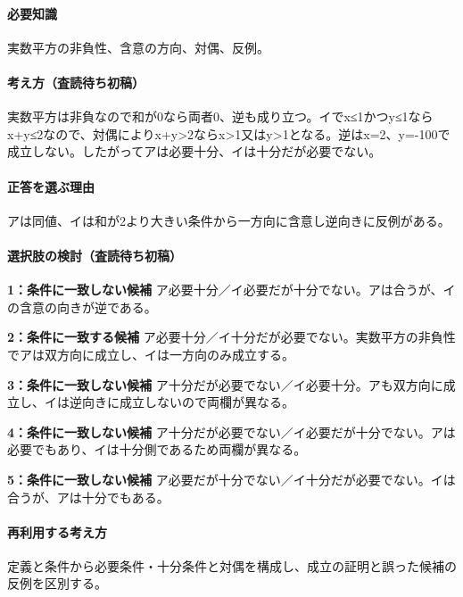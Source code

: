 \paragraph{必要知識} 実数平方の非負性、含意の方向、対偶、反例。

\paragraph{考え方（査読待ち初稿）} 実数平方は非負なので和が0なら両者0、逆も成り立つ。イでx≤1かつy≤1ならx+y≤2なので、対偶によりx+y>2ならx>1又はy>1となる。逆はx=\allowbreak{}2、y=-100で成立しない。したがってアは必要十分、イは十分だが必要でない。

\paragraph{正答を選ぶ理由} アは同値、イは和が2より大きい条件から一方向に含意し逆向きに反例がある。

\paragraph{選択肢の検討（査読待ち初稿）}\mbox{}\par

\noindent\textbf{1：条件に一致しない候補} ア必要十分／イ必要だが十分でない。アは合うが、イの含意の向きが逆である。\par

\noindent\textbf{2：条件に一致する候補} ア必要十分／イ十分だが必要でない。実数平方の非負性でアは双方向に成立し、イは一方向のみ成立する。\par

\noindent\textbf{3：条件に一致しない候補} ア十分だが必要でない／イ必要十分。アも双方向に成立し、イは逆向きに成立しないので両欄が異なる。\par

\noindent\textbf{4：条件に一致しない候補} ア十分だが必要でない／イ必要だが十分でない。アは必要でもあり、イは十分側であるため両欄が異なる。\par

\noindent\textbf{5：条件に一致しない候補} ア必要だが十分でない／イ十分だが必要でない。イは合うが、アは十分でもある。\par

\paragraph{再利用する考え方} 定義と条件から必要条件・十分条件と対偶を構成し、成立の証明と誤った候補の反例を区別する。

